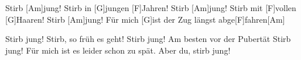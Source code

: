 \begin{guitar}
	\begin{highlightbar}
		Stirb [Am]jung! Stirb in [G]jungen [F]Jahren! Stirb [Am]jung! Stirb mit [F]vollen [G]Haaren!
		Stirb [Am]jung! Für mich [G]ist der Zug längst abge[F]fahren[Am]{}
		
		Stirb jung! Stirb, so früh es geht! Stirb jung! Am besten vor der Pubertät
		Stirb jung! Für mich ist es leider schon zu spät. Aber du, stirb jung!
	\end{highlightbar}
\end{guitar}